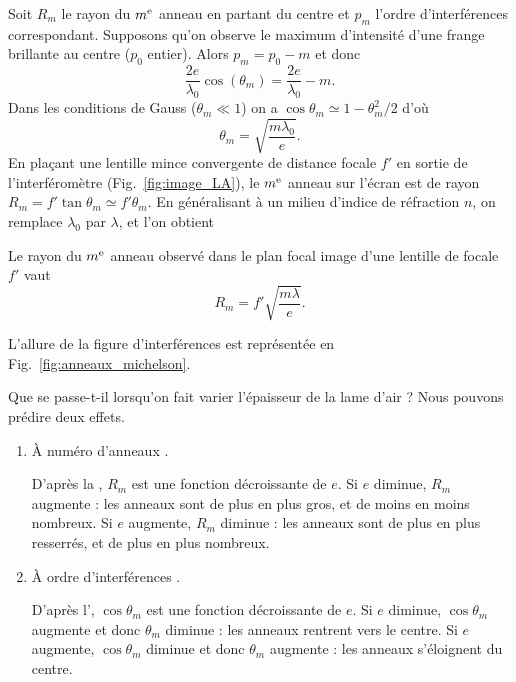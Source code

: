 \documentclass[12pt,fancy]{cours}
\begin{document}
\begin{demo}
Soit $R_{m}$ le rayon du $m^{\rm e}$ anneau en partant du centre et $p_m$ l'ordre d'interférences correspondant. Supposons qu'on observe le maximum d'intensité d'une frange brillante au centre ($p_0$ entier). Alors $p_{m}=p_{0}-m$ et donc
\begin{equation}
  \frac{2e}{\lambda_0}\cos(\theta_m)=\frac{2e}{\lambda_0}-m.
  \end{equation}
  Dans les conditions de Gauss ($\theta_m \ll 1$) on a $\cos \theta_m\simeq 1-\theta_{m}^2/2$ d'où
\begin{equation}\label{eq:delta_LA}
  \theta_{m}=\sqrt{\frac{m\lambda_0}{e}}.
 \end{equation}
 En plaçant une lentille mince convergente de distance focale $f'$ en sortie de l'interféromètre (Fig.~\ref{fig:image_LA}), le $m^{\rm e}$ anneau sur l'écran est de rayon $R_{m}=f'\tan \theta_{m} \simeq f' \theta_m$. En généralisant à un milieu d'indice de réfraction $n$, on remplace $\lambda_0$ par $\lambda$, et l’on obtient 
\end{demo}

\begin{theorem}\label{form:anneaux}
Le rayon du $m^{\rm e}$ anneau observé dans le plan focal image d'une lentille de focale $f'$ vaut
\begin{equation*}
R_{m}=f'\sqrt{\frac{m\lambda}{e}}.
\end{equation*}
\end{theorem}

L'allure de la figure d'interférences est représentée en Fig.~\ref{fig:anneaux_michelson}.



 Que se passe-t-il lorsqu'on fait varier l'épaisseur de la lame d'air ? Nous pouvons prédire deux effets.
 \begin{enumerate}
  \item À numéro d'anneaux .
  
  D'après la , $R_m$ est une fonction décroissante de $e$. Si $e$ diminue, $R_m$ augmente : les anneaux sont de plus en plus gros, et de moins en moins nombreux. Si $e$ augmente, $R_m$ diminue : les anneaux sont de plus en plus resserrés, et de plus en plus nombreux.

  \item À ordre d'interférences .
  
  D'après l', $\cos \theta_m$ est une fonction décroissante de $e$. Si $e$ diminue, $\cos \theta_m$ augmente et donc $\theta_m$ diminue : les anneaux rentrent vers le centre. Si $e$ augmente, $\cos \theta_m$ diminue et donc $\theta_m$ augmente : les anneaux s'éloignent du centre.
 \end{enumerate} 
 
\end{document}

